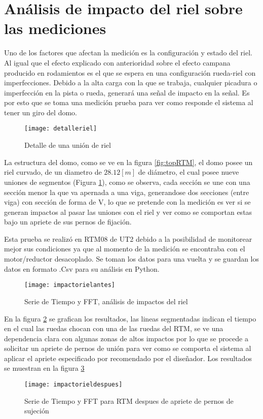     \section{Análisis de impacto del riel sobre las mediciones}
        Uno de los factores que afectan la medición es la configuración y estado del riel. Al igual que el efecto explicado con anterioridad sobre el efecto campana producido en rodamientos es el que se espera en una configuración rueda-riel con imperfecciones. Debido a la alta carga con la que se trabaja, cualquier picadura o imperfección en la pista o rueda, generará una señal de impacto en la señal. Es por esto que se toma una medición prueba para ver como responde el sistema al tener un giro del domo.
        \begin{figure}[H]
            \centering
            \texttt{[image: detalleriel]}
            \caption{Detalle de una unión de riel}
            \label{fig:unionesderiel}
        \end{figure}
        
        La estructura del domo, como se ve en la figura \ref{fig:topRTM}, el domo posee un riel curvado, de un diametro de $28.12 [m]$ de diámetro, el cual posee nueve uniones de segmentos (Figura \ref{fig:unionesderiel}), como se observa, cada sección se une con una sección menor la que va apernada a una viga, generandose dos secciones (entre viga) con sección de forma de V, lo que se pretende con la medición es ver si se generan impactos al pasar las uniones con el riel y ver como se comportan estas bajo un apriete de sus pernos de fijación. 
        
        
        Esta prueba se realizó en RTM08 de UT2 debido a la posibilidad de monitorear mejor sus condiciones ya que al momento de la medición se encontraba con el motor/reductor desacoplado. Se toman los datos para una vuelta y se guardan los datos en formato .Csv para su análisis en Python.
        \begin{figure}[H]
            \centering
            \texttt{[image: impactorielantes]}
            \caption{Serie de Tiempo y FFT, análisis de impactos del riel}
            \label{fig:impactorielantes}
        \end{figure}
        
        En la figura \ref{fig:impactorielantes} se grafican los resultados, las lineas segmentadas indican el tiempo en el cual las ruedas chocan con una de las ruedas del RTM, se ve una dependencia clara con algunas zonas de altos impactos por lo que se procede a solicitar un apriete de pernos de unión para ver como se comporta el sistema al aplicar el apriete especificado por recomendado por el diseñador. Los resultados se muestran en la figura \ref{fig:impactorieldespues}
        \begin{figure}[H]
            \centering
            \texttt{[image: impactorieldespues]}
            \caption{Serie de Tiempo y FFT para RTM despues de apriete de pernos de sujeción}
            \label{fig:impactorieldespues}
        \end{figure}
        
